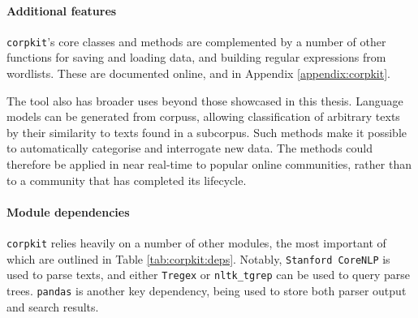 

\paragraph{Additional features}

\texttt{corpkit}'s core classes and methods are complemented by a number of other functions for saving and loading data, and building regular expressions from wordlists. These are documented online, and in Appendix \ref{appendix:corpkit}.

The tool also has broader uses beyond those showcased in this thesis. Language models can be generated from \glspl{corpus}, allowing classification of arbitrary texts by their similarity to texts found in a subcorpus. Such methods make it possible to automatically categorise and interrogate new data. The methods could therefore be applied in near real\hyp{}time to popular online communities, rather than to a community that has completed its lifecycle.

\paragraph{Module dependencies}

\texttt{corpkit} relies heavily on a number of other modules, the most important of which are outlined in Table \ref{tab:corpkit:deps}. Notably, \texttt{Stanford CoreNLP} is used to parse texts, and either \texttt{Tregex} or \texttt{nltk\_tgrep} can be used to query parse trees. \texttt{pandas} is another key dependency, being used to store both parser output and search results.


